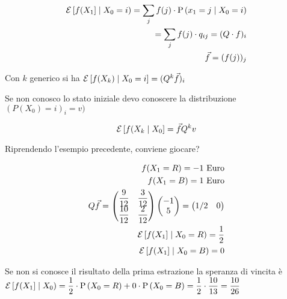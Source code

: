 \begin{equation*}
	\begin{aligned}
	\mathcal{E}\left[f(X_1\right] \mid X_0 = i) = \sum_j f(j) \cdot \text{P}\left(x_1 = j \mid X_0 = i\right) \\
	= \sum_j f(j) \cdot q_{ij} = (Q \cdot f)_i \\
	\vec{f} = (f(j))_j
	\end{aligned}
\end{equation*}

Con $ k $ generico si ha $\mathcal{E}\left[f(X_k) \mid X_0 = i\right] = (Q^k \vec{f})_i $

Se non conosco lo stato iniziale devo conoscere la distribuzione $ (P(X_0) =i)_i = v) $

\begin{equation*}
\mathcal{E}\left[f(X_k \mid X_0\right] = \vec{f} Q^k v
\end{equation*}

\begin{exrc}
\end{exrc}

Riprendendo l'esempio precedente, conviene giocare?


\begin{equation*}
	\begin{aligned}
	f(X_1 = R) = -1 \text{ Euro} \\
	f(X_1 = B) = 1 \text{ Euro} \\
	Q\vec{f} = \begin{pmatrix}
	\dfrac{9}{12} & \dfrac{3}{12} \\
	\dfrac{10}{12} & \dfrac{2}{12}
	\end{pmatrix} \begin{pmatrix}
	-1 \\ 5
	\end{pmatrix} = \begin{pmatrix}
	1/2 & 0
	\end{pmatrix} \\
	\mathcal{E}\left[f(X_1\right] \mid X_0 = R) = \dfrac{1}{2} \\
	\mathcal{E}\left[f(X_1\right] \mid X_0 = B) = 0
	\end{aligned}
\end{equation*}

Se non si conosce il risultato della prima estrazione la speranza di vincita è $ \mathcal{E}\left[f(X_1\right] \mid X_0)  = \dfrac{1}{2} \cdot \text{P}\left(X_0 = R\right) + 0 \cdot \text{P}\left(X_0 = B\right) = \dfrac{1}{2} \cdot \dfrac{10}{13} = \dfrac{10}{26} $

